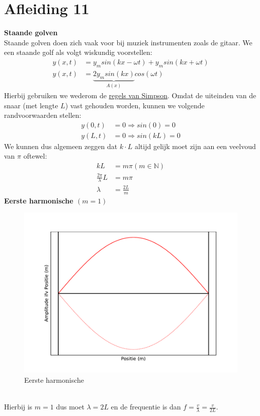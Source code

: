 \documentclass[a4paper,kul]{kulakarticle} %
\begin{document}
\section{Afleiding 11}
\textbf{Staande golven}\\
Staande golven doen zich vaak voor bij muziek instrumenten zoals de gitaar. We een staande golf als volgt wiskundig voorstellen:
\begin{align*}
	y(x,t) &=y_msin(kx-\omega t)+y_msin(kx+\omega t)\\
	y(x,t) &=\underbrace{2y_msin(kx)}_{A(x)}cos(\omega t)
\end{align*}
Hierbij gebruiken we wederom de \href{https://nl.wikipedia.org/wiki/Lijst_van_goniometrische_gelijkheden#Som-naar-product-identiteiten_(regels_van_Simpson)}{regels van Simpson}. Omdat de uiteinden van de snaar (met lengte $L$) vast gehouden worden, kunnen we volgende randvoorwaarden stellen:
\begin{align*}
	y(0,t)  &= 0 \Rightarrow sin(0)=0\\
	y(L,t) &= 0 \Rightarrow sin(kL)=0
\end{align*}
We kunnen dus algemeen zeggen dat $k\cdot L$ altijd gelijk moet zijn aan een veelvoud van $\pi$ oftewel:
\begin{align*}
	kL & = m\pi (m\in\mathbb{N})\\
	\frac{2\pi}{\lambda}L &=m\pi\\
	\lambda & = \frac{2L}{m}
\end{align*}
\textbf{Eerste harmonische $(m = 1)$}\\
\begin{figure}[h]
	\centering
	\includegraphics[width=0.7\linewidth]{Eerste_harm}
	\caption[Eerste harmonische]{Eerste harmonische}
	\label{fig:eersteharm}
\end{figure}\\
Hierbij is $m = 1$ dus moet $\lambda = 2L$ en de frequentie is dan $f = \frac{v}{\lambda} = \frac{v}{2L}$.\\
\end{document}
